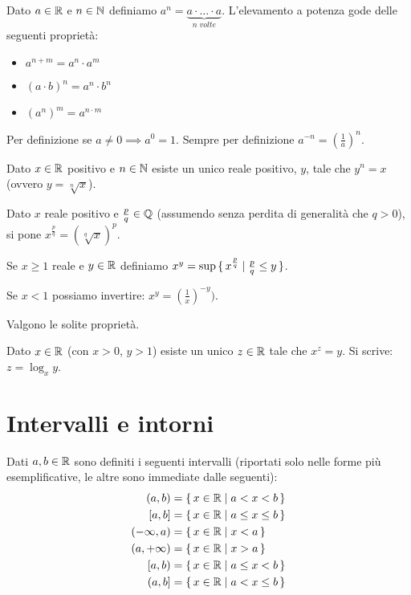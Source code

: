 Dato $a \in \mathbb R$ e $n \in \mathbb N$ definiamo $a^n = \underbrace{a \cdot \ldots \cdot a}_{n\;volte}$. L'elevamento a potenza gode delle seguenti proprietà:
\begin{itemize}
\item $a^{n+m} = a^n \cdot a^m$
\item $(a \cdot b)^n = a^n \cdot b^n$
\item $(a^n)^m = a^{n \cdot m}$
\end{itemize}

Per definizione se $a \neq 0 \implies a^0 = 1$. Sempre per definizione $a^{-n} = (\frac{1}{a})^n$.

\begin{theorem}
Dato $x \in \mathbb R$ positivo e $n \in \mathbb N$ esiste un unico reale positivo, $y$, tale che $y^n = x$ (ovvero $y = \sqrt[n]{x}$).
\end{theorem}

\begin{definition}
Dato $x$ reale positivo e $\frac{p}{q} \in \mathbb Q$ (assumendo senza perdita di generalità che $q > 0$), si pone $x^{\frac{p}{q}} = (\sqrt[q]{x})^p$.

Se $x \ge 1$ reale e $y \in \mathbb R$ definiamo $x^y = \sup \set{x^\frac{p}{q} | \frac{p}{q} \le y}$.

Se $x < 1$ possiamo invertire: $x^y = (\frac{1}{x})^{-y})$.

Valgono le solite proprietà.
\end{definition}

\begin{theorem}
Dato $x \in \mathbb R$ (con $x > 0$, $y > 1$) esiste un unico $z \in \mathbb R$ tale che $x^z = y$. Si scrive: $z = \log_x y$.
\end{theorem}

\section{Intervalli e intorni}
Dati $a, b \in \mathbb R$ sono definiti i seguenti intervalli (riportati solo nelle forme più esemplificative, le altre sono immediate dalle seguenti):
\begin{align*}
(a,b) &= \set{x \in \R | a < x < b} \\
[a,b] &= \set{x \in \R | a \le x \le b} \\
(-\infty,a) &= \set{x \in \R | x < a} \\
(a, +\infty) &= \set{x \in \R | x > a} \\
[a,b) &= \set{x \in \R | a \le x < b} \\
(a,b] &= \set{x \in \R | a < x \le b}
\end{align*}

